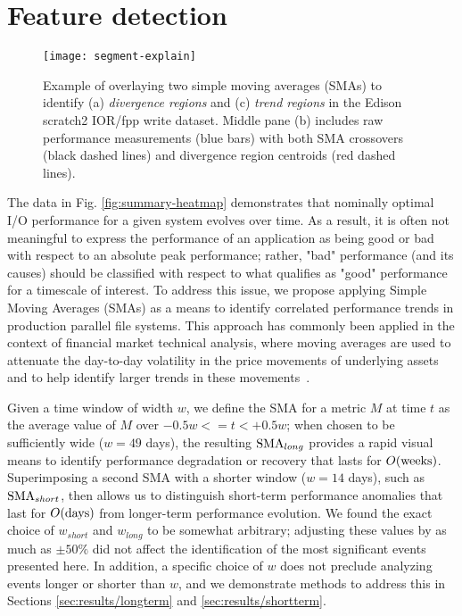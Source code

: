 \section{Feature detection}  \label{sec:features}

\begin{figure}[t]
    \centering
    \texttt{[image: segment-explain]}
    \vspace{-.35in}
    \caption{Example of overlaying two simple moving averages (SMAs) to identify (a) \emph{divergence regions} and (c) \emph{trend regions} in the Edison scratch2 IOR/fpp write dataset.  Middle pane (b) includes raw performance measurements (blue bars) with both SMA crossovers (black dashed lines) and divergence region centroids (red dashed lines).}
    \label{fig:segment-explain}
\end{figure}

The data in Fig. \ref{fig:summary-heatmap} demonstrates that nominally optimal I/O performance for a given system evolves over time.
As a result, it is often not meaningful to express the performance of an application as being good or bad with respect to an absolute peak performance;
rather, "bad" performance (and its causes) should be classified with respect to what qualifies as "good" performance for a timescale of interest.
To address this issue, we propose applying Simple Moving Averages (SMAs) as a means to identify correlated performance trends in production parallel file systems.
This approach has commonly been applied in the context of financial market technical analysis, where moving averages are used to attenuate the day-to-day volatility in the price movements of underlying assets and to help identify larger trends in these movements~\cite{james1968monthly,gunasekarage2001profitability}.

Given a time window of width $w$, we define the SMA for a metric $M$ at time $t$ as the average value of $M$ over ${-0.5w <= t < +0.5w}$;
when chosen to be sufficiently wide ($w = 49$ days), the resulting $\textup{SMA}_{long}$ provides a rapid visual means to identify performance degradation or recovery that lasts for $O(\textup{weeks})$.  Superimposing a second SMA with a shorter window ($w = 14$ days), such as $\textup{SMA}_{short}$, then allows us to distinguish short-term performance anomalies that last for $O(\textup{days})$ from longer-term performance evolution. We found the exact choice of $w_{short}$ and $w_{long}$ to be somewhat arbitrary; adjusting these values by as much as $\pm 50\%$ did not affect the identification of the most significant events presented here.
In addition, a specific choice of $w$ does not preclude analyzing events longer or shorter than $w$, and we demonstrate methods to address this in Sections \ref{sec:results/longterm} and \ref{sec:results/shortterm}.

